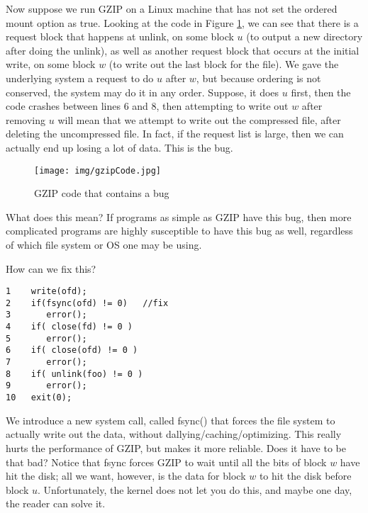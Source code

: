 \documentclass[a4paper]{article}
\begin{document}
Now suppose we run GZIP on a Linux machine that has not set the ordered mount option as true. Looking at the code in Figure \ref{fig:GZIPCode}, we can see that there is a request block that happens at unlink, on some block $u$ (to output a new directory after doing the unlink), as well as another request block that occurs at the initial write, on some block $w$ (to write out the last block for the file). We gave the underlying system a request to do $u$ after $w$, but because ordering is not conserved, the system may do it in any order. Suppose, it does $u$ first, then the code crashes between lines 6 and 8, then attempting to write out $w$ after removing $u$ will mean that we attempt to write out the compressed file, after deleting the uncompressed file. In fact, if the request list is large, then we can actually end up losing a lot of data. This is the bug.

\begin{figure}[H]
\centering
\texttt{[image: img/gzipCode.jpg]}
\caption{\label{fig:GZIPCode} GZIP code that contains a bug}
\end{figure}

What does this mean? If programs as simple as GZIP have this bug, then more complicated programs are highly susceptible to have this bug as well, regardless of which file system or OS one may be using. 

How can we fix this? 
\begin{lstlisting}
1    write(ofd);
2    if(fsync(ofd) != 0)   //fix
3       error();
4    if( close(fd) != 0 )
5    	error();
6    if( close(ofd) != 0 )
7    	error();
8    if( unlink(foo) != 0 )
9    	error();
10   exit(0);
\end{lstlisting}
We introduce a new system call, called fsync() that forces the file system to actually write out the data, without dallying/caching/optimizing. This really hurts the performance of GZIP, but makes it more reliable. Does it have to be that bad? Notice that fsync forces GZIP to wait until all the bits of block $w$ have hit the disk; all we want, however, is the data for block $w$ to hit the disk before block $u$. Unfortunately, the kernel does not let you do this, and maybe one day, the reader can solve it.
\end{document}
